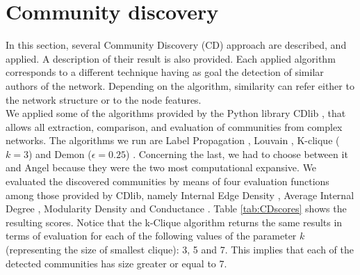 \documentclass[sigchi]{acmart}
\begin{document}
\section{Community discovery}\label{sec:communityDiscovery}
In this section, several Community Discovery (CD) approach are described, and applied. A description of their result is also provided. Each applied algorithm corresponds to a different technique having as goal the detection of similar authors of the network. 
Depending on the algorithm, similarity can refer either to the network structure or to the node features. \\
We applied some of the algorithms provided by the Python library CDlib \cite{rossetti:hal-02197272}, that allows all extraction, comparison, and evaluation of communities from complex networks. The algorithms we run are Label Propagation \cite{label}, Louvain \cite{Blondel_2008}, K-clique ($k=3$) \cite{kclique} and Demon ($\epsilon=0.25$) \cite{Coscia2012DEMONAL}. Concerning the last, we had to choose between it and Angel \cite{angel} because they were the two most computational expansive.
We evaluated the discovered communities by means of four evaluation functions among those provided by CDlib, namely Internal Edge Density \cite{intEdgeDensity}, Average Internal Degree \cite{avgIntDegree}, Modularity Density \cite{modDensity} and Conductance \cite{conductance}. Table \ref{tab:CDscores} shows the resulting scores. Notice that the k-Clique algorithm returns the same results in terms of evaluation for each of the following values of the parameter $k$ (representing the size of smallest clique): 3, 5 and 7. This implies that each of the detected communities has size greater or equal to 7.

\begin{table}[ht!]
  \caption{Community Discovery algorithms evaluation}
  \label{tab:CDscores}
\end{table}
\end{document}
